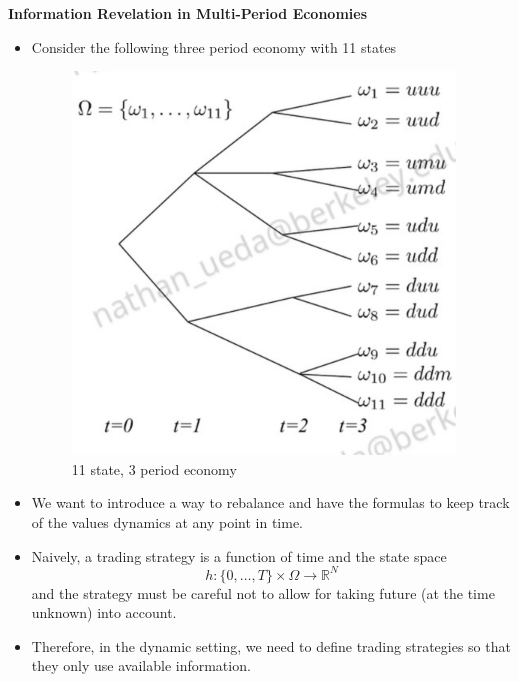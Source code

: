 \documentclass[11pt]{article}
\begin{document}
\textbf{Information Revelation in Multi-Period Economies}
\begin{itemize}
    \item Consider the following three period economy with 11 states 
    
    \begin{figure}[H] 
        \centering 
        \includegraphics[width=4in]{imgs/three_period_economy.png}
        \caption{11 state, 3 period economy}
    \end{figure}
    
    \item We want to introduce a way to rebalance and have the formulas to keep track of the 
    values dynamics at any point in time.
    \item Naively, a trading strategy is a function of time and the state space 
    \[h:  \{0, \ldots, T\} \times \Omega \rightarrow \mathbb{R}^N\]
    and the strategy must be careful not to allow for taking future (at the time unknown) into 
    account. 
    \item Therefore, in the dynamic setting, we need to define trading strategies so that they 
    only use available information. 


\end{itemize}
\end{document}
